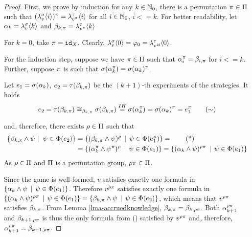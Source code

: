 \begin{proof}
First, we prove by induction for any $k\in\mathbb{N}_0$,
  there is a permutation $\pi\in \Pi$ such that
  $(\lambda^{\sigma}_{v}\langle i\rangle)^\pi = \lambda^{\tau}_{v^\pi}\langle i\rangle$
  for all $i\in\mathbb{N}_0$, $i<=k$.
For better readability, let
  $\alpha_k = \lambda^{\sigma}_{v}\langle k\rangle$ and
  $\beta_{k, \pi} = \lambda^{\tau}_{v^\pi}\langle k\rangle$

For $k=0$, take $\pi = \mathtt{id}_X$.
Clearly, $\lambda^{\sigma}_{v}\langle0\rangle = \varphi_0 = \lambda^{\tau}_{v^{\mathtt{id}}}\langle0\rangle$.

For the induction step, suppose we have $\pi\in\Pi$ such that
  $\alpha_i^\pi = \beta_{i, \pi}$ for $i <= k$.
Further, suppose $\pi$ is such that
  $\sigma(\alpha_k^\pi) = \sigma(\alpha_k)^\pi$. 

Let $e_1 = \sigma(\alpha_k)$, $e_2 = \tau(\beta_{k, \pi})$
  be the $(k+1)$-th experiments  of the strategies.
It holds
\begin{equation}
e_2 = \tau(\beta_{k, \pi})
    \cong_{\beta_{k, \pi}}  \sigma(\beta_{k, \pi})
    \stackrel{IH}{=} \sigma(\alpha_k^\pi)
    = \sigma(\alpha_k)^\pi
    = e_1^\pi \label{eq:expsym}\tag{$\sim$}
\end{equation}

and, therefore, there exists $\rho\in\Pi$ such that
\begin{align}
 \{ \knowx_{k, \perm} \wedge \formx \| \formx\in\outcome(\exp_2) \} &= %
 \{ (\knowx_{k, \perm} \wedge \formx)^\permx \| \formx\in\outcome(\exp_1^\perm) \} = \label{eq:sets}\tag{*}\\
&= \{ (\know_k^\perm \wedge \formx^\perm)^\permx \| \formx\in\outcome(\exp_1) \} =
 \{ (\know_k \wedge \formx)^{\permx\perm} \| \formx\in\outcome(\exp_1) \}
\end{align}
As $\rho\in\Pi$ and $\Pi$ is a permutation group, $\rho\pi\in\Pi$.

Since the game is well-formed,
  $v$ satisfies exactly one formula in
  $\{ \alpha_k \wedge \psi \:\:|\:\: \psi\in\Phi(e_1) \}$.
Therefore $v^{\rho\pi}$ satisfies exactly one formula
  in
  $\{ (\alpha_k \wedge \psi)^{\rho\pi} \:\:|\:\: \psi\in\Phi(e_1) \}  =
   \{ \beta_{k, \pi} \wedge \psi \:\:|\:\: \psi\in\Phi(e_2) \}$,
  which means that $v^{\rho\pi}$ satisfies $\beta_{k, \pi}$.
From Lemma \ref{lma-accruedknowledge},
  $\beta_{k, \pi} = \beta_{k, \rho\pi}$.
Both $\alpha_{k+1}^{\rho\pi}$ and $\beta_{k+1, \rho\pi}$ is thus the only
  formula from () satisfied by $v^{\rho\pi}$ and, therefore,
  $\alpha_{k+1}^{\rho\pi} = \beta_{k+1, \rho\pi}$.



\end{proof}
